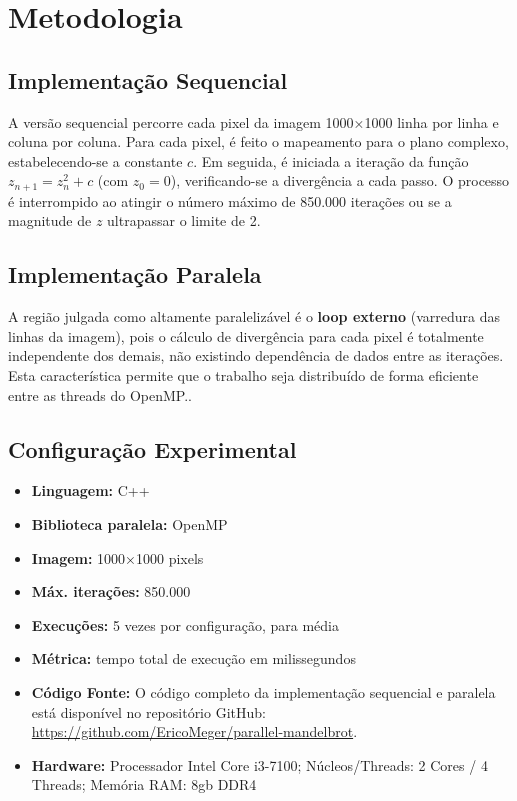 \documentclass[12pt]{article}
\begin{document}
\section{Metodologia}
\subsection{Implementação Sequencial}

A versão sequencial percorre cada pixel da imagem 1000×1000 linha por linha e coluna por coluna. Para cada pixel, é feito o mapeamento para o plano complexo, estabelecendo-se a constante $c$. Em seguida, é iniciada a iteração da função $z_{n+1} = z_{n}^{2} + c$ (com $z_{0}=0$), verificando-se a divergência a cada passo. O processo é interrompido ao atingir o número máximo de 850.000 iterações ou se a magnitude de $z$ ultrapassar o limite de 2.

\subsection{Implementação Paralela}

A região julgada como altamente paralelizável é o \textbf{loop externo} (varredura das linhas da imagem), pois o cálculo de divergência para cada pixel é totalmente independente dos demais, não existindo dependência de dados entre as iterações. Esta característica permite que o trabalho seja distribuído de forma eficiente entre as threads do OpenMP.\cite{omp:ufsc, omp:scheduling}.

\subsection{Configuração Experimental}

\begin{itemize}
  \item \textbf{Linguagem:} C++
  \item \textbf{Biblioteca paralela:} OpenMP
  \item \textbf{Imagem:} 1000×1000 pixels
  \item \textbf{Máx. iterações:} 850.000
  \item \textbf{Execuções:} 5 vezes por configuração, para média
  \item \textbf{Métrica:} tempo total de execução em milissegundos
  \item \textbf{Código Fonte:} O código completo da implementação sequencial e paralela está disponível no repositório GitHub: \url{https://github.com/EricoMeger/parallel-mandelbrot}.
  \item \textbf{Hardware:} Processador Intel Core i3-7100; Núcleos/Threads: 2 Cores / 4  Threads; Memória RAM: 8gb DDR4
\end{itemize}
\end{document}
